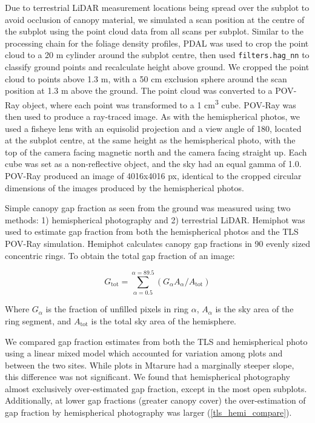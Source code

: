 \documentclass[11pt,a4paper]{article}
\begin{document}
Due to terrestrial LiDAR measurement locations being spread over the subplot to avoid occlusion of canopy material, we simulated a scan position at the centre of the subplot using the point cloud data from all scans per subplot. Similar to the processing chain for the foliage density profiles, PDAL was used to crop the point cloud to a 20 m cylinder around the subplot centre, then used \texttt{filters.hag\_nn} to classify ground points and recalculate height above ground. We cropped the point cloud to points above 1.3 m, with a 50 cm exclusion sphere around the scan position at 1.3 m above the ground. The point cloud was converted to a POV-Ray object, where each point was transformed to a 1 cm\textsuperscript{3} cube. POV-Ray was then used to produce a ray-traced image. As with the hemispherical photos, we used a fisheye lens with an equisolid projection and a view angle of 180\textdegree, located at the subplot centre, at the same height as the hemispherical photo, with the top of the camera facing magnetic north and the camera facing straight up. Each cube was set as a non-reflective object, and the sky had an equal gamma of 1.0. POV-Ray produced an image of 4016x4016 px, identical to the cropped circular dimensions of the images produced by the hemispherical photos.

Simple canopy gap fraction as seen from the ground was measured using two methods: 1) hemispherical photography and 2) terrestrial LiDAR. Hemiphot \citep{} was used to estimate gap fraction from both the hemispherical photos and the TLS POV-Ray simulation. Hemiphot calculates canopy gap fractions in 90 evenly sized concentric rings. To obtain the total gap fraction of an image:

\begin{equation}
	G_{\text{tot}} = \sum_{\alpha{} = 0.5}^{\alpha{} = 89.5}(G_{\alpha{}} A_{\alpha{}} / A_{\text{tot}})
\end{equation}

Where $G_{\alpha{}}$ is the fraction of unfilled pixels in ring $\alpha{}$, $A_{\alpha{}}$ is the sky area of the ring segment, and $A_{\text{tot}}$ is the total sky area of the hemisphere.

We compared gap fraction estimates from both the TLS and hemispherical photo using a linear mixed model which accounted for variation among plots and between the two sites. While plots in Mtarure had a marginally steeper slope, this difference was not significant. We found that hemispherical photography almost exclusively over-estimated gap fraction, except in the most open subplots. Additionally, at lower gap fractions (greater canopy cover) the over-estimation of gap fraction by hemispherical photography was larger (\autoref{tls_hemi_compare}).
\end{document}
